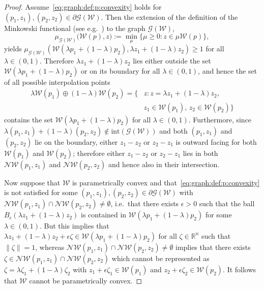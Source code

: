 \documentclass{elsarticle}
\theoremstyle{remark}
\theoremstyle{definition}
\begin{document}
%
\begin{proof}
%
Assume~\eqref{eq:graph:def:p:convexity} holds for $(p_1,z_1),(p_2,z_2)\in\partial\mathscr G(\mathcal W)$.
%
Then the extension of the definition of the Minkowski functional (see e.g.~\cite{Rudin:91}) to the graph $\mathscr G(\mathcal W)$,
\[
\mu_{\mathscr G(\mathcal W)} \bigl(
\mathcal W(p), z \bigr)
:= \min_\mu \{\mu \geq 0 : z \in \mu \mathcal W(p)\},
\]
yields $\mu_{\mathscr G(\mathcal W)}\left(\mathcal W(\lambda p_1 + (1-\lambda)p_2),\lambda z_1+(1-\lambda)z_2\right)\geq1$ for all $\lambda\in(0,1)$. Therefore $\lambda z_1 + (1-\lambda) z_2$
lies either outside the set $\mathcal W(\lambda p_1+(1-\lambda)p_2)$ or on its boundary for all $\lambda\in(0,1)$, and hence the set of all possible interpolation points 
%
\[
\begin{split}
  \lambda \mathcal W(p_1)\oplus (1-\lambda)\mathcal W(p_2) = \{&z : z=\lambda z_1 + (1-\lambda) z_2,\\ &z_1\in\mathcal  W(p_1),\, z_2\in\mathcal W(p_2)\}
\end{split}
\]
%
contains the set $\mathcal W(\lambda p_1 + (1-\lambda)p_2)$ for all $\lambda\in(0,1)$.
%
Furthermore, since $\lambda(p_1,z_1)+(1-\lambda)(p_2,z_2)\not\in \text{int}(\mathscr G(\mathcal W))$ and both $(p_1,z_1)$ and $(p_2,z_2)$ lie on the boundary, either $z_1-z_2$ or $z_2-z_1$ is outward facing for both $\mathcal W(p_1)$ and $\mathcal W(p_2)$; therefore either $z_1-z_2$ or $z_2-z_1$ lies in both $\mathcal N\mathcal W(p_1,z_1)$ and $\mathcal N\mathcal W(p_2,z_2)$ and hence also in their intersection.

Now suppose that $\mathcal W$ is parametrically convex and that~\eqref{eq:graph:def:p:convexity} is not satisfied for 
some $(p_1,z_1),(p_2,z_2)\in\partial\mathscr G(\mathcal W)$ with $\mathcal N\mathcal W(p_1,z_1)\cap\mathcal 
N\mathcal W(p_2,z_2)\neq\emptyset$, 
%
i.e.~that there exists $\epsilon>0$ such that the ball
$B_\epsilon(\lambda z_1 + (1-\lambda)z_2 )$
is contained in $\mathcal W(\lambda p_1 + (1-\lambda)p_2)$ for some $\lambda \in (0,1)$.
%
But this implies that $\lambda z_1 + (1-\lambda) z_2 + \epsilon\zeta \in \mathcal W(\lambda p_1+(1-\lambda)p_2)$  for all $\zeta\in\mathbb R^n$ such that $\|\zeta\| = 1$, whereas
$\mathcal N\mathcal W(p_1,z_1)\cap\mathcal N\mathcal W(p_2,z_2)\neq\emptyset$ implies that there exists 
$\zeta \in\mathcal N\mathcal W(p_1,z_1)\cap\mathcal N\mathcal W(p_2,z_2)$ which cannot be represented as
$\zeta =\lambda \zeta_1+
(1-\lambda)\zeta_2$
with $z_1 + \epsilon \zeta_1\in\mathcal W(p_1)$ and $z_2  + \epsilon \zeta_2\in\mathcal W(p_2)$.
%
It follows that $\mathcal W$ cannot be parametrically convex.
\end{proof}
%
\end{document}
